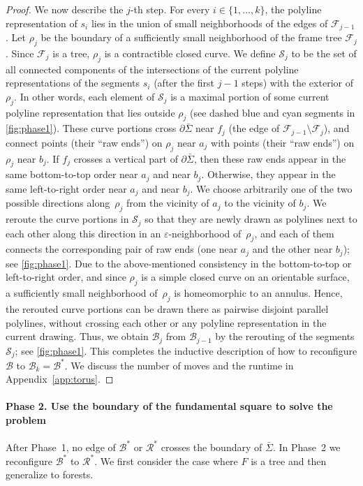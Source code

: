 \documentclass[a4paper,USenglish,cleveref,colorlinks=true,urlcolor=black,linkcolor=black,citecolor=black,thm-restate,authorcolumns]{lipics-v2021}
\theoremstyle{claimstyle}
\begin{document}
\begin{proof}
    We now describe the $j$-th step.
    For every $i\in\{1,\ldots,k\}$, the polyline representation of $s_i$ lies in the union of small neighborhoods of the edges of ${\mathcal F}_{j-1}$.
    Let $\rho_j$ be the boundary of a sufficiently small neighborhood of the frame tree ${\mathcal F}_j$.
    Since ${\mathcal F}_j$ is a tree, $\rho_j$ is a contractible closed curve.
    We define $\mathcal S_j$ to be the set of all connected components of the intersections of the current polyline representations of the segments $s_i$ (after the first $j-1$ steps) with the exterior of $\rho_j$.
    In other words, each element of $\mathcal S_j$ is a maximal portion of some current polyline representation that lies outside $\rho_j$ (see dashed blue and cyan segments in \cref{fig:phase1}).
    These curve portions cross $\partial\bar\Sigma$ near $f_j$ (the edge of ${\mathcal F}_{j-1}\setminus {\mathcal F}_{j}$),
    and connect points (their ``raw ends'') on $\rho_j$ near $a_j$ with points (their ``raw ends'') on $\rho_j$ near $b_j$.
    If $f_j$ crosses a vertical part of $\partial\bar\Sigma$, then these raw ends appear in the same bottom-to-top order near $a_j$ and near $b_j$.
    Otherwise, they appear in the same left-to-right order near $a_j$ and near $b_j$.
    We choose arbitrarily one of the two possible directions along~$\rho_j$ from the vicinity of $a_j$ to the vicinity of $b_j$.
    We reroute the curve portions in $\mathcal{S}_j$ so that they are newly drawn as polylines next to each other along this direction in an $\varepsilon$-neighborhood of~$\rho_j$, and each of them connects the corresponding pair of raw ends (one near $a_j$ and the other near $b_j$); see \cref{fig:phase1}.
    Due to the above-mentioned consistency in the bottom-to-top or left-to-right order, and since $\rho_j$ is a simple closed curve on an orientable surface, a sufficiently small neighborhood of~$\rho_j$ is homeomorphic to an annulus.
    Hence, the rerouted curve portions can be drawn there as pairwise disjoint parallel polylines, without crossing each other or any polyline representation in the current drawing.
    Thus, we obtain $\mathcal{B}_j$ from  $\mathcal{B}_{j-1}$ by the rerouting of the segments $\mathcal{S}_j$; see \cref{fig:phase1}.
    This completes the inductive description of how to reconfigure $\mathcal{B}$ to $\mathcal{B}_k = \mathcal{B}^*$.
    We discuss the number of moves and the runtime in Appendix~\ref{app:torus}.
\end{proof}

\paragraph*{Phase 2. Use the boundary of the fundamental square to solve the problem}
After Phase~1, no edge of $\mathcal B^*$ or $\mathcal R^*$ crosses the boundary of $\bar\Sigma$.
In Phase~2 we reconfigure $\mathcal B^*$ to $\mathcal R^*$.
We first consider the case where $F$ is a tree and then generalize to forests.
\end{document}
